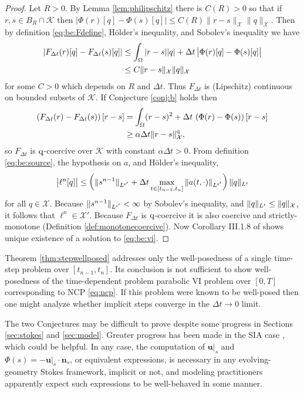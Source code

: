 \documentclass[hidelinks,onefignum,onetabnum,final]{siamart220329}  %
\newcommand{\bn}{\mathbf{n}}
\newcommand{\bu}{\mathbf{u}}
\newcommand{\cK}{\mathcal{K}}
\newcommand{\cX}{\mathcal{X}}
\newcommand{\qq}{{\text{\textnormal{q}}}}
\newcommand{\rr}{{\text{\textnormal{r}}}}
\begin{document}
\begin{proof}  Let $R>0$.  By Lemma \ref{lem:philipschitz} there is $C(R)>0$ so that if $r,s\in B_R\cap\cK$ then $\big|\Phi(r)[q] - \Phi(s)[q]\big| \le C(R) \|r-s\|_{\cX} \|q\|_{\cX}$.  Then by definition \eqref{eq:be:Fdefine}, H\"older's inequality, and Sobolev's inequality we have
\begin{align}
\left|F_{\Delta t}(r)[q] - F_{\Delta t}(s)[q]\right| &\le \int_\Omega |r-s||q| + \Delta t\, \big|\Phi(r)[q] - \Phi(s)[q]\big| \\
    &\le C \|r-s\|_{\cX} \|q\|_\cX \notag
\end{align}
for some $C>0$ which depends on $R$ and $\Delta t$.  Thus $F_{\Delta t}$ is (Lipschitz) continuous on bounded subsets of $\cK$.  If Conjecture \ref{conj:b} holds then
\begin{align}
\left(F_{\Delta t}(r) - F_{\Delta t}(s)\right)[r-s] &= \int_\Omega (r-s)^2 + \Delta t\, \left(\Phi(r) - \Phi(s)\right)[r-s] \\
    &\ge \alpha\Delta t \|r-s\|_{\cX}^\qq, \notag
\end{align}
so $F_{\Delta t}$ is $\qq$-coercive over $\cK$ with constant $\alpha\Delta t>0$.  From definition \eqref{eq:be:source}, the hypothesis on $a$, and H\"older's inequality,
\begin{equation}
\big|\ell^n[q]\big| \le \left(\|s^{n-1}\|_{L^{\rr'}} + \Delta t \max_{t\in[t_{n-1},t_n]} \|a(t,\cdot)\|_{L^{\rr'}}\right) \|q\|_{L^\rr}
\label{eq:sourcetermbound}
\end{equation}
for all $q \in \cX$.  Because $\|s^{n-1}\|_{L^{\rr'}}<\infty$ by Sobolev's inequality, and $\|q\|_{L^\rr} \le \|q\|_{\cX}$, it follows that $\ell^n \in \cX'$.  Because $F_{\Delta t}$ is $\qq$-coercive it is also coercive and strictly-monotone (Definition \ref{def:monotonecoercive}).  Now Corollary III.1.8 of \cite{KinderlehrerStampacchia1980} shows unique existence of a solution to \eqref{eq:be:vi}.
\end{proof}

Theorem \ref{thm:stepwellposed} addresses only the well-posedness of a single time-step problem over $[t_{n-1},t_n]$.  Its conclusion is not sufficient to show well-posedness of the time-dependent problem parabolic VI problem over $[0,T]$ corresponding to NCP \eqref{eq:ncp}.  If this problem were known to be well-posed then one might analyze whether implicit steps converge in the $\Delta t\to 0$ limit.

The two Conjectures may be difficult to prove despite some progress in Sections \ref{sec:stokes} and \ref{sec:model}.  Greater progress has been made in the SIA case \cite{Calvoetal2003,JouvetBueler2012,PiersantiTemam2023}, which could be helpful.  In any case, the computation of $\bu|_s$ and $\Phi(s)=-\bu|_s\cdot \bn_s$, or equivalent expressions, is necessary in any evolving-geometry Stokes framework, implicit or not, and modeling practitioners apparently expect such expressions to be well-behaved in some manner.
\end{document}
